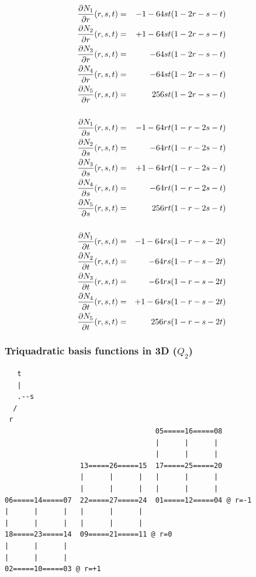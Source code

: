 \begin{eqnarray}
\frac{\partial N_1}{\partial r}(r,s,t) &=& -1 - 64st(1-2r-s-t) \nonumber\\
\frac{\partial N_2}{\partial r}(r,s,t) &=& +1 - 64st(1-2r-s-t) \nonumber\\
\frac{\partial N_3}{\partial r}(r,s,t) &=&    - 64st(1-2r-s-t) \nonumber\\
\frac{\partial N_4}{\partial r}(r,s,t) &=&    - 64st(1-2r-s-t) \nonumber\\
\frac{\partial N_5}{\partial r}(r,s,t) &=&     256st(1-2r-s-t) \nonumber\\ \nonumber\\ 
\frac{\partial N_1}{\partial s}(r,s,t) &=& -1 - 64rt(1-r-2s-t) \nonumber\\
\frac{\partial N_2}{\partial s}(r,s,t) &=&    - 64rt(1-r-2s-t) \nonumber\\
\frac{\partial N_3}{\partial s}(r,s,t) &=& +1 - 64rt(1-r-2s-t) \nonumber\\
\frac{\partial N_4}{\partial s}(r,s,t) &=&    - 64rt(1-r-2s-t) \nonumber\\
\frac{\partial N_5}{\partial s}(r,s,t) &=&     256rt(1-r-2s-t) \nonumber\\ \nonumber\\ 
\frac{\partial N_1}{\partial t}(r,s,t) &=& -1 - 64rs(1-r-s-2t) \nonumber\\
\frac{\partial N_2}{\partial t}(r,s,t) &=&    - 64rs(1-r-s-2t) \nonumber\\
\frac{\partial N_3}{\partial t}(r,s,t) &=&    - 64rs(1-r-s-2t) \nonumber\\
\frac{\partial N_4}{\partial t}(r,s,t) &=& +1 - 64rs(1-r-s-2t) \nonumber\\
\frac{\partial N_5}{\partial t}(r,s,t) &=&     256rs(1-r-s-2t) \nonumber
\end{eqnarray}






\subsubsection{Triquadratic basis functions in 3D ($Q_2$)}

\begin{verbatim}
   t
   |
   .--s
  /
 r
                                    05=====16=====08 
                                    |      |      |  
                                    |      |      |  
                  13=====26=====15  17=====25=====20 
                  |      |      |   |      |      |  
                  |      |      |   |      |      |  
06=====14=====07  22=====27=====24  01=====12=====04 @ r=-1
|      |      |   |      |      |  
|      |      |   |      |      |   
18=====23=====14  09=====21=====11 @ r=0
|      |      |   
|      |      |  
02=====10=====03 @ r=+1
\end{verbatim}





